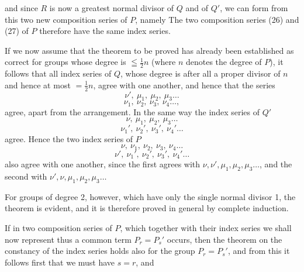 and since $R$ is now a greatest normal divisor of $Q$ and of $Q'$,
we can form from this two new composition series of $P$,
namely
The two composition series (26) and (27) of $P$ therefore have
the same index series.

If we now assume that the theorem to be proved has already been
established as correct for groups whose degree is $\leqq \frac{1}{2}n$
(where $n$ denotes the degree of $P$), it follows that all index
series of $Q$, whose degree is after all a proper divisor of $n$
and hence at most $= \frac{1}{2}n$, agree with one another, and hence
that the series
\[
\nu',\ \mu_1,\ \mu_2,\ \mu_3 \ldots
\]
\[
\nu_1,\ \nu_2,\ \nu_3,\ \nu_4 \ldots,
\]
agree, apart from the arrangement. In the same way the index
series of $Q'$
\[
\nu,\ \mu_1,\ \mu_2,\ \mu_3 \ldots
\]
\[
\nu_1',\ \nu_2',\ \nu_3',\ \nu_4' \ldots
\]
agree. Hence the two index series of $P$
\[
\nu,\ \nu_1,\ \nu_2,\ \nu_3,\ \nu_4 \ldots
\]
\[
\nu',\ \nu_1',\ \nu_2',\ \nu_3',\ \nu_4' \ldots
\]
also agree with one another, since the first agrees with $\nu, \nu', \mu_1, \mu_2, \mu_3
\ldots$, and the second with $\nu', \nu, \mu_1, \mu_2, \mu_3 \ldots$

For groups of degree 2, however, which have only the single normal
divisor 1, the theorem is evident, and it is therefore proved in
general by complete induction.

If in two composition series of $P$, which together with their
index series we shall now represent thus
a common term $P_r = P_s'$ occurs, then the theorem on the
constancy of the index series holds also for the group $P_r =
P_s'$, and from this it follows first that we must have $s = r$, and

